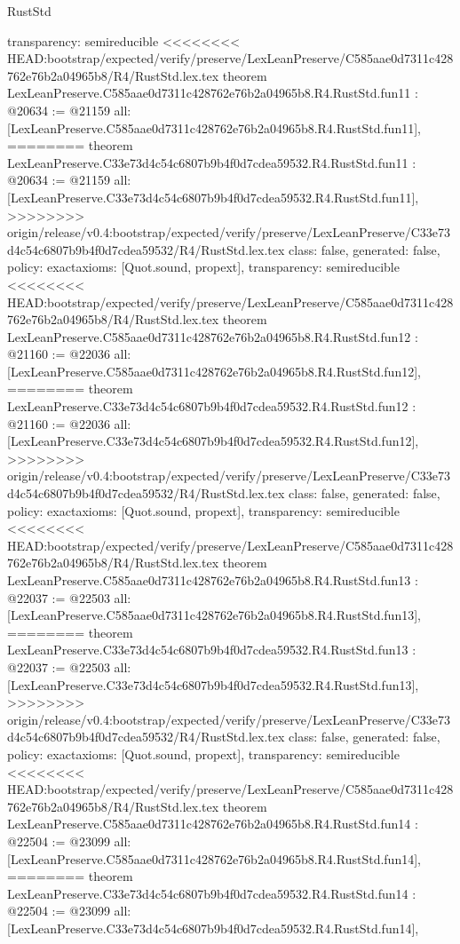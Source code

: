 \begin{lexlean}{RustStd}
\begin{coremodule}
{\begin{coremodule}
{{{{{{{{{{{{{{  transparency: semireducible
}
<<<<<<<< HEAD:bootstrap/expected/verify/preserve/LexLeanPreserve/C585aae0d7311c428762e76b2a04965b8/R4/RustStd.lex.tex
theorem LexLeanPreserve.C585aae0d7311c428762e76b2a04965b8.R4.RustStd.fun11 : @20634 := @21159 {
  all: [LexLeanPreserve.C585aae0d7311c428762e76b2a04965b8.R4.RustStd.fun11],
========
theorem LexLeanPreserve.C33e73d4c54c6807b9b4f0d7cdea59532.R4.RustStd.fun11 : @20634 := @21159 {
  all: [LexLeanPreserve.C33e73d4c54c6807b9b4f0d7cdea59532.R4.RustStd.fun11],
>>>>>>>> origin/release/v0.4:bootstrap/expected/verify/preserve/LexLeanPreserve/C33e73d4c54c6807b9b4f0d7cdea59532/R4/RustStd.lex.tex
  class: false,
  generated: false,
  policy: exact{axioms: [Quot.sound, propext]},
  transparency: semireducible
}
<<<<<<<< HEAD:bootstrap/expected/verify/preserve/LexLeanPreserve/C585aae0d7311c428762e76b2a04965b8/R4/RustStd.lex.tex
theorem LexLeanPreserve.C585aae0d7311c428762e76b2a04965b8.R4.RustStd.fun12 : @21160 := @22036 {
  all: [LexLeanPreserve.C585aae0d7311c428762e76b2a04965b8.R4.RustStd.fun12],
========
theorem LexLeanPreserve.C33e73d4c54c6807b9b4f0d7cdea59532.R4.RustStd.fun12 : @21160 := @22036 {
  all: [LexLeanPreserve.C33e73d4c54c6807b9b4f0d7cdea59532.R4.RustStd.fun12],
>>>>>>>> origin/release/v0.4:bootstrap/expected/verify/preserve/LexLeanPreserve/C33e73d4c54c6807b9b4f0d7cdea59532/R4/RustStd.lex.tex
  class: false,
  generated: false,
  policy: exact{axioms: [Quot.sound, propext]},
  transparency: semireducible
}
<<<<<<<< HEAD:bootstrap/expected/verify/preserve/LexLeanPreserve/C585aae0d7311c428762e76b2a04965b8/R4/RustStd.lex.tex
theorem LexLeanPreserve.C585aae0d7311c428762e76b2a04965b8.R4.RustStd.fun13 : @22037 := @22503 {
  all: [LexLeanPreserve.C585aae0d7311c428762e76b2a04965b8.R4.RustStd.fun13],
========
theorem LexLeanPreserve.C33e73d4c54c6807b9b4f0d7cdea59532.R4.RustStd.fun13 : @22037 := @22503 {
  all: [LexLeanPreserve.C33e73d4c54c6807b9b4f0d7cdea59532.R4.RustStd.fun13],
>>>>>>>> origin/release/v0.4:bootstrap/expected/verify/preserve/LexLeanPreserve/C33e73d4c54c6807b9b4f0d7cdea59532/R4/RustStd.lex.tex
  class: false,
  generated: false,
  policy: exact{axioms: [Quot.sound, propext]},
  transparency: semireducible
}
<<<<<<<< HEAD:bootstrap/expected/verify/preserve/LexLeanPreserve/C585aae0d7311c428762e76b2a04965b8/R4/RustStd.lex.tex
theorem LexLeanPreserve.C585aae0d7311c428762e76b2a04965b8.R4.RustStd.fun14 : @22504 := @23099 {
  all: [LexLeanPreserve.C585aae0d7311c428762e76b2a04965b8.R4.RustStd.fun14],
========
theorem LexLeanPreserve.C33e73d4c54c6807b9b4f0d7cdea59532.R4.RustStd.fun14 : @22504 := @23099 {
  all: [LexLeanPreserve.C33e73d4c54c6807b9b4f0d7cdea59532.R4.RustStd.fun14],
}}}}}}}}}}}}}}}}}}
\end{coremodule}}
\end{coremodule}
\end{lexlean}
